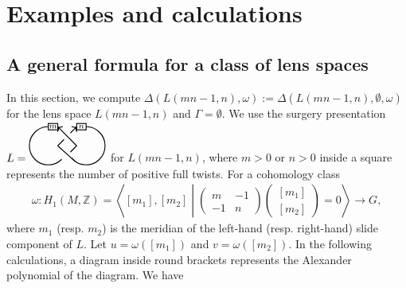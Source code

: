 \documentclass[12pt]{amsart}
\begin{document}
\section{Examples and calculations}
\subsection{A general formula for a class of lens spaces}
In this section, we compute $\Delta (L(mn-1, n), \omega):=\Delta (L(mn-1, n), \emptyset, \omega)$ for the lens space $L(mn-1, n)$ and $\Gamma=\emptyset$. We use the surgery presentation 
$L=\begin{tikzpicture}[baseline=-0.65ex, thick, scale=1]
\draw (-0.45,1) node {$\scriptstyle m$};
\draw (-0.3,1.1) to (-0.6,1.1);
\draw (-0.3,0.89) to (-0.3,1.11);
\draw (-0.3,0.90) to (-0.6,0.90);
\draw (-0.6,0.89) to (-0.6,1.11);
%
\draw (-0.3,1) [<-]to (0.3,0.4);
\draw (-0.3,0.4) to (-0.1,0.6);
\draw (0.1,0.8) [->] to (0.3,1);
\draw (-0.3,0.4) to (0.25,-0.09);
%
\draw (0.45,1) node {$\scriptstyle n$};
\draw (0.6,1.1) to (0.3,1.1);
\draw (0.6,0.89) to (0.6,1.11);
\draw (0.6,0.90) to (0.3,0.90);
\draw (0.3,0.89) to (0.3,1.11);
%
\draw (0.1,0.2) to (0.3,0.4);
\draw  (-0.6,1) arc (90:315:0.6);
\draw  (0.6,1) arc (90:-140:0.6);
\end{tikzpicture}$ for $L(mn-1, n)$, where $m>0$ or $n>0$ inside a square represents the number of positive full twists.
For a cohomology class
\begin{align}\label{eq:Lens}
\omega : H_1(M, \mathbb{Z})=\left < [m_1], [m_2]  \middle| \left(\begin{matrix} m & -1 \\ -1 & n \end{matrix} \right) \left(\begin{matrix} [m_1] \\ [m_2] \end{matrix} \right) =0 \right > \to G,
\end{align}
where $m_1$ (resp. $m_2$) is the meridian of the left-hand (resp. right-hand) slide component of $L$.
Let $u=\omega([m_1])$ and $v=\omega([m_2])$.
In the following calculations, a diagram inside round brackets represents the Alexander polynomial of the diagram. We have
\end{document}

